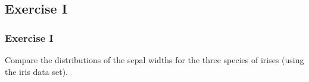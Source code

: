 %





\subsection{Exercise I}
\begin{frame}
	\frametitle{Exercise I}
	Compare the distributions of the sepal widths for the three species of irises (using the \ttfamily iris \normalfont data set).
\end{frame}